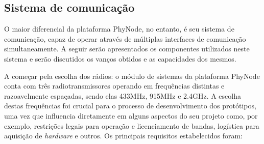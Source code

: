 \documentclass[
	12pt,				%
	openright,			%
	oneside,
	a4paper,			%
	english,			%
	french,				%
	spanish,			%
	brazil				%
	]{abntex2}
\begin{document}
\subsection{Sistema de comunicação}

O maior diferencial da plataforma PhyNode, no entanto, é seu sistema de comunicação, capaz de operar através de múltiplas interfaces de comunicação simultaneamente. A seguir serão apresentados os componentes utilizados neste sistema e serão discutidos os vanços obtidos e as capacidades dos mesmos.

A começar pela escolha dos rádios: o módulo de sistemas da plataforma PhyNode conta com três radiotransmissores operando em frequências distintas e razoavelmente espaçadas, sendo elas 433MHz, 915MHz e 2.4GHz. A escolha destas frequências foi crucial para o processo de desenvolvimento dos protótipos, uma vez que influencia diretamente em alguns aspectos do seu projeto como, por exemplo, restrições legais para operação e licenciamento de bandas, logística para aquisição de \textit{hardware} e outros. Os principais requisitos estabelecidos foram:
\end{document}
